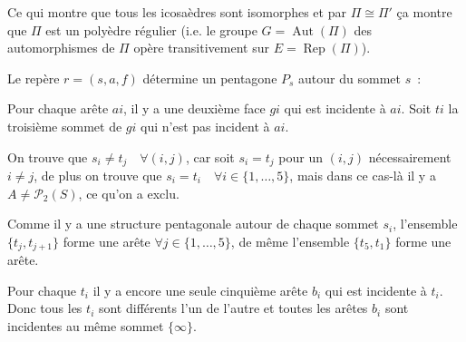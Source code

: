 Ce qui montre que tous les icosaèdres sont isomorphes et par $\Pi \cong \Pi'$ ça montre que $\Pi$ est un polyèdre régulier (i.e. le groupe $G = \operatorname{Aut}(\Pi)$ des automorphismes de $\Pi$ opère transitivement sur $E = \operatorname{Rep}(\Pi)$).

Le repère $r = (s, a, f)$ détermine un pentagone $P_s$ autour du sommet $s$~:

\begin{center}
\end{center}

Pour chaque arête $ai$, il y a une deuxième face $gi$ qui est incidente à $ai$. Soit $ti$ la troisième sommet de $gi$ qui n'est pas incident à $ai$.


On trouve que $s_i \neq t_j \quad \forall (i,j)$, car soit $s_i = t_j$ pour un $(i,j)$ nécessairement $i \neq j$, de plus on trouve que $s_i = t_i \quad \forall i \in \{1,\dots,5\}$, mais dans ce cas-là il y a $A \neq \mathcal{P}_2(S)$, ce qu'on a exclu.

Comme il y a une structure pentagonale autour de chaque sommet $s_i$, l'ensemble $\{t_j, t_{j+1}\}$ forme une arête $\forall j \in \{1,\dots,5\}$, de même l'ensemble $\{t_5, t_1\}$ forme une arête.

Pour chaque $t_i$ il y a encore une seule cinquième arête $b_i$ qui est incidente à $t_i$. Donc tous les $t_i$ sont différents l'un de l'autre et toutes les arêtes $b_i$ sont incidentes au même sommet $\{ \infty \}$.

